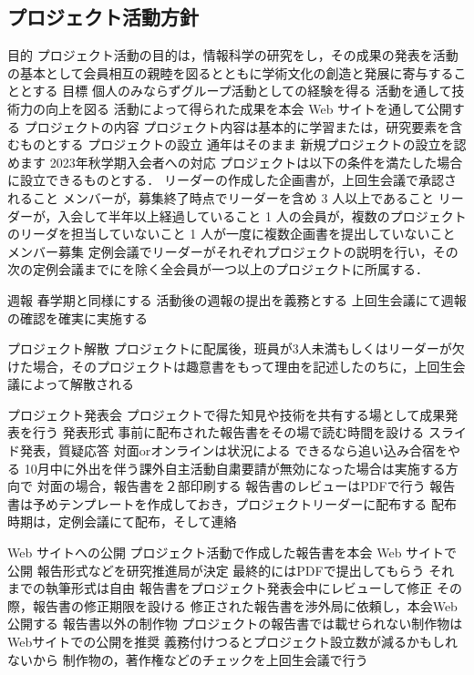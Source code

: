 \subsection*{プロジェクト活動方針}


目的
    プロジェクト活動の目的は，情報科学の研究をし，その成果の発表を活動の基本として会員相互の親睦を図るとともに学術文化の創造と発展に寄与することとする
目標
    個人のみならずグループ活動としての経験を得る
    活動を通して技術力の向上を図る
    活動によって得られた成果を本会 Web サイトを通して公開する
プロジェクトの内容
    プロジェクト内容は基本的に学習または，研究要素を含むものとする
プロジェクトの設立
    通年はそのまま
    新規プロジェクトの設立を認めます
    2023年秋学期入会者への対応
    プロジェクトは以下の条件を満たした場合に設立できるものとする．
    リーダーの作成した企画書が，上回生会議で承認されること
    メンバーが，募集終了時点でリーダーを含め 3 人以上であること
    リーダーが，入会して半年以上経過していること
    1 人の会員が，複数のプロジェクトのリーダを担当していないこと
    1 人が一度に複数企画書を提出していないこと
メンバー募集
    定例会議でリーダーがそれぞれプロジェクトの説明を行い，その次の定例会議までに\fourthGrade{}を除く全会員が一つ以上のプロジェクトに所属する．

週報
    春学期と同様にする
    活動後の週報の提出を義務とする
    上回生会議にて週報の確認を確実に実施する
    
    
プロジェクト解散
    プロジェクトに配属後，班員が3人未満もしくはリーダーが欠けた場合，そのプロジェクトは趣意書をもって理由を記述したのちに，上回生会議によって解散される
    
プロジェクト発表会
    プロジェクトで得た知見や技術を共有する場として成果発表を行う
    発表形式
    事前に配布された報告書をその場で読む時間を設ける
    スライド発表，質疑応答
    対面orオンラインは状況による
    できるなら追い込み合宿をやる
    10月中に外出を伴う課外自主活動自粛要請が無効になった場合は実施する方向で
    対面の場合，報告書を２部印刷する
    報告書のレビューはPDFで行う
    報告書は予めテンプレートを作成しておき，プロジェクトリーダーに配布する
    配布時期は，定例会議にて配布，そして連絡
        
Web サイトへの公開
    プロジェクト活動で作成した報告書を本会 Web サイトで公開
    報告形式などを研究推進局が決定
    最終的にはPDFで提出してもらう
    それまでの執筆形式は自由
    報告書をプロジェクト発表会中にレビューして修正
    その際，報告書の修正期限を設ける
    修正された報告書を渉外局に依頼し，本会Web公開する
    報告書以外の制作物
    プロジェクトの報告書では載せられない制作物はWebサイトでの公開を推奨
    義務付けつるとプロジェクト設立数が減るかもしれないから
    制作物の，著作権などのチェックを上回生会議で行う
        
